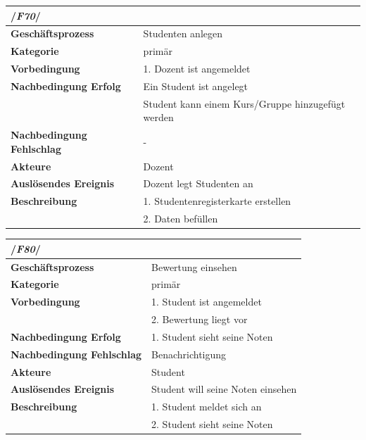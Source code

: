 		
			\begin{table}[ht]
				\begin{tabular}{ll}
					\multicolumn{2}{l}{/\textbf{\textit{F70}}/}\\\hline
					 \textbf{Geschäftsprozess} & Studenten anlegen\\ 
					 \textbf{Kategorie} & primär \\ 
					 \textbf{Vorbedingung} & 1. Dozent ist angemeldet \phantom{aaaaaaaaaaaaaaaaaaaaaaaaaaaaaaa} \\
					 \textbf{Nachbedingung Erfolg} & Ein Student ist angelegt\\
					 & Student kann einem Kurs/Gruppe hinzugefügt werden\\
					 \textbf{Nachbedingung Fehlschlag} & -\\
					 \textbf{Akteure} & Dozent \\ 
					 \textbf{Auslösendes Ereignis} & Dozent legt Studenten an\\ 
					 \textbf{Beschreibung} &  1. Studentenregisterkarte erstellen\\
					 & 2. Daten befüllen\\
				 \end{tabular} 
				\label{tab:F70}
				\end{table}	
			
			\begin{table}[ht]
				\begin{tabular}{ll}
					\multicolumn{2}{l}{/\textbf{\textit{F80}}/}\\\hline
					 \textbf{Geschäftsprozess} & Bewertung einsehen\\ 
					 \textbf{Kategorie} & primär \\ 
					 \textbf{Vorbedingung} & 1. Student ist angemeldet \phantom{aaaaaaaaaaaaaaaaaaaaaaaaaaaaaaa} \\
					 &2. Bewertung liegt vor\\
					 \textbf{Nachbedingung Erfolg} & 1. Student sieht seine Noten\\
					  \textbf{Nachbedingung Fehlschlag} & Benachrichtigung\\
					 \textbf{Akteure} & Student \\ 
					 \textbf{Auslösendes Ereignis} & Student will seine Noten einsehen\\ 
					 \textbf{Beschreibung} &  1. Student meldet sich an\\
					 & 2. Student sieht seine Noten\\
				 \end{tabular} 
				\label{tab:F80}
				\end{table}	


